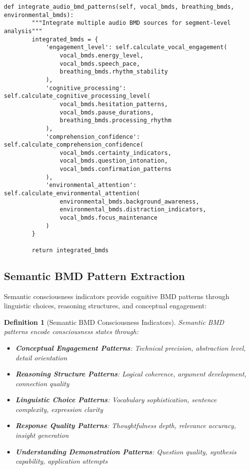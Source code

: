 \documentclass[12pt,a4paper]{article}
\newtheorem{definition}[theorem]{Definition}
\begin{document}
\begin{lstlisting}[style=pythonstyle, caption=Audio BMD Pattern Recognition]
    def integrate_audio_bmd_patterns(self, vocal_bmds, breathing_bmds, environmental_bmds):
        """Integrate multiple audio BMD sources for segment-level analysis"""
        integrated_bmds = {
            'engagement_level': self.calculate_vocal_engagement(
                vocal_bmds.energy_level,
                vocal_bmds.speech_pace,
                breathing_bmds.rhythm_stability
            ),
            'cognitive_processing': self.calculate_cognitive_processing_level(
                vocal_bmds.hesitation_patterns,
                vocal_bmds.pause_durations,
                breathing_bmds.processing_rhythm
            ),
            'comprehension_confidence': self.calculate_comprehension_confidence(
                vocal_bmds.certainty_indicators,
                vocal_bmds.question_intonation,
                vocal_bmds.confirmation_patterns
            ),
            'environmental_attention': self.calculate_environmental_attention(
                environmental_bmds.background_awareness,
                environmental_bmds.distraction_indicators,
                vocal_bmds.focus_maintenance
            )
        }
        
        return integrated_bmds
\end{lstlisting}

\subsection{Semantic BMD Pattern Extraction}

Semantic consciousness indicators provide cognitive BMD patterns through linguistic choices, reasoning structures, and conceptual engagement:

\begin{definition}[Semantic BMD Consciousness Indicators]
Semantic BMD patterns encode consciousness states through:
\begin{itemize}
\item \textbf{Conceptual Engagement Patterns}: Technical precision, abstraction level, detail orientation
\item \textbf{Reasoning Structure Patterns}: Logical coherence, argument development, connection quality
\item \textbf{Linguistic Choice Patterns}: Vocabulary sophistication, sentence complexity, expression clarity
\item \textbf{Response Quality Patterns}: Thoughtfulness depth, relevance accuracy, insight generation
\item \textbf{Understanding Demonstration Patterns}: Question quality, synthesis capability, application attempts
\end{itemize}
\end{definition}
\end{document}
